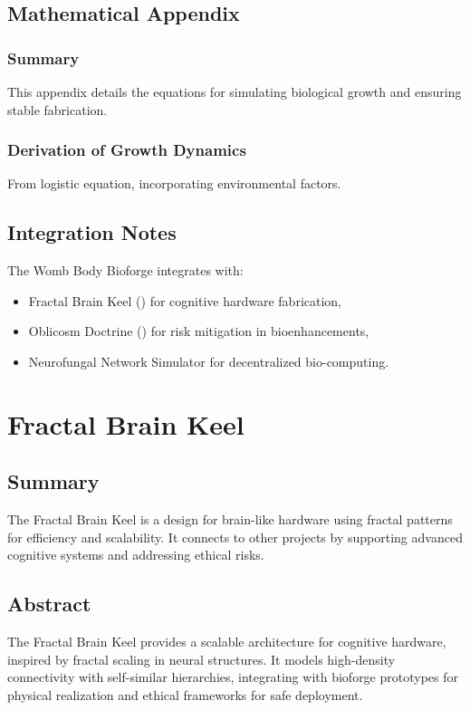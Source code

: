 \documentclass[11pt,oneside]{memoir}
\theoremstyle{plain}
\begin{document}
\section{Mathematical Appendix}
\subsection{Summary}
This appendix details the equations for simulating biological growth and ensuring stable fabrication.

\subsection{Derivation of Growth Dynamics}
From logistic equation, incorporating environmental factors.

\section{Integration Notes}
The Womb Body Bioforge integrates with:
\begin{itemize}
    \item Fractal Brain Keel () for cognitive hardware fabrication,
    \item Oblicosm Doctrine () for risk mitigation in bioenhancements,
    \item Neurofungal Network Simulator for decentralized bio-computing.
\end{itemize}

\chapter{Fractal Brain Keel}
\label{sec:fractal_brain}

\section{Summary}
The Fractal Brain Keel is a design for brain-like hardware using fractal patterns for efficiency and scalability. It connects to other projects by supporting advanced cognitive systems and addressing ethical risks.

\section{Abstract}
The Fractal Brain Keel provides a scalable architecture for cognitive hardware, inspired by fractal scaling in neural structures. It models high-density connectivity with self-similar hierarchies, integrating with bioforge prototypes for physical realization and ethical frameworks for safe deployment.
\end{document}
